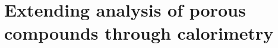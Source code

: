 
\graphicspath{ {\thisch/figures/} }

\chapter{Extending analysis of porous 
compounds through calorimetry}\label{calo}








 